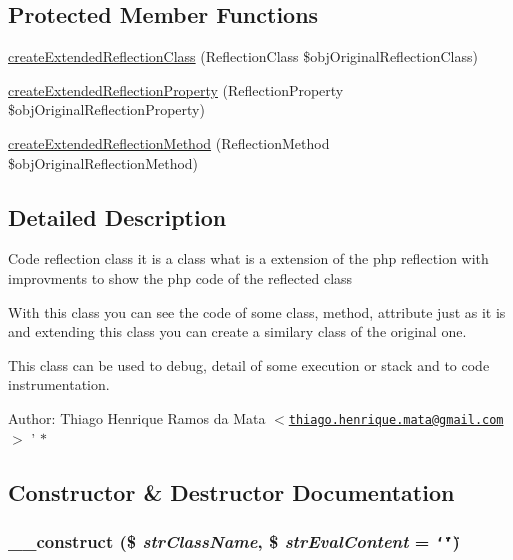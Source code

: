 \subsection*{Protected Member Functions}
\begin{CompactItemize}
\item 
\hyperlink{class_code_reflection_class_6b56ec198bc6a5b5a72076e4e7c19e29}{createExtendedReflectionClass} (ReflectionClass \$objOriginalReflectionClass)
\item 
\hyperlink{class_code_reflection_class_bce271bf4f7b77b8b11986404241ab5c}{createExtendedReflectionProperty} (ReflectionProperty \$objOriginalReflectionProperty)
\item 
\hyperlink{class_code_reflection_class_ec7c1d4b204b6e3a6291d3b867afb688}{createExtendedReflectionMethod} (ReflectionMethod \$objOriginalReflectionMethod)
\end{CompactItemize}


\subsection{Detailed Description}
Code reflection class it is a class what is a extension of the php reflection with improvments to show the php code of the reflected class

With this class you can see the code of some class, method, attribute just as it is and extending this class you can create a similary class of the original one.

This class can be used to debug, detail of some execution or stack and to code instrumentation.

\begin{Desc}
\item[Author:]Thiago Henrique Ramos da Mata $<$\href{mailto:thiago.henrique.mata@gmail.com}{\tt thiago.henrique.mata@gmail.com}$>$ ' $\ast$ \end{Desc}


\subsection{Constructor \& Destructor Documentation}
\hypertarget{class_code_reflection_class_4df49469648d1e8de92c18bb8ac40b1b}{
\subsubsection[{\_\-\_\-construct}]{\setlength{\rightskip}{0pt plus 5cm}\_\-\_\-construct (\$ {\em strClassName}, \/  \$ {\em strEvalContent} = {\tt \char`\"{}\char`\"{}})}}
\label{class_code_reflection_class_4df49469648d1e8de92c18bb8ac40b1b}



